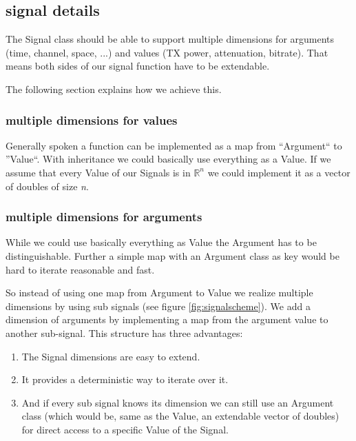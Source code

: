 

\subsection{signal details}
\label{sec:signaldetail}

The Signal class should be able to support multiple dimensions for arguments (time, channel, space, ...) and values (TX power, attenuation, bitrate). That means both sides of our signal function have to be extendable.

The following section explains how we achieve this.

\subsubsection{multiple dimensions for values}

Generally spoken a function can be implemented as a map from ``Argument`` to
''Value``. With inheritance we could basically use everything as a Value.
If we assume that every Value of our Signals is in $\mathbb{R}^n$ we could
implement it as a vector of doubles of size \textit{n}.

\subsubsection{multiple dimensions for arguments}

While we could use basically everything as Value the Argument has to be
distinguishable. Further a simple map with an Argument class as key would be
hard to iterate reasonable and fast.

So instead of using one map from Argument to Value we realize multiple
dimensions by using sub signals (see figure \ref{fig:signalscheme}). We add a
dimension of arguments by implementing a map from the argument value to another
sub-signal. This structure has three advantages:

\begin{enumerate}
\item The Signal dimensions are easy to extend.
\item It provides a deterministic way to iterate over it.
\item And if every sub signal knows its dimension we can still use an Argument class (which would be, same as the Value, an extendable vector of doubles) for direct access to a specific Value of the Signal.
\end{enumerate}


